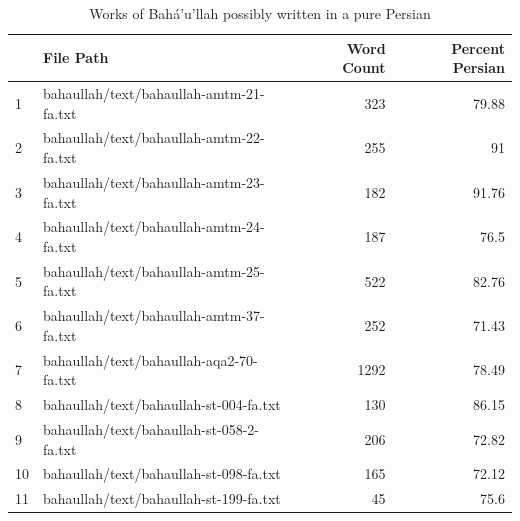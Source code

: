 \documentclass[12pt, oneside]{report}
\begin{document}
\begin{table}[]
	\centering
	\begin{tabular}{|l|l|r|r|}
		\hline
		\rowcolor[HTML]{EFEFEF} 
		\textbf{} & \textbf{File Path}                       & \textbf{Word Count}         & \textbf{Percent Persian}      \\ \hline
		1         & bahaullah/text/bahaullah-amtm-21-fa.txt  & \cellcolor[HTML]{FFFFFF}323 & \cellcolor[HTML]{FFFFFF}79.88 \\ \hline
		\rowcolor[HTML]{EFEFEF} 
		2         & bahaullah/text/bahaullah-amtm-22-fa.txt  & 255                         & 91                            \\ \hline
		\rowcolor[HTML]{FFFFFF} 
		3         & bahaullah/text/bahaullah-amtm-23-fa.txt  & 182                         & 91.76                         \\ \hline
		\rowcolor[HTML]{EFEFEF} 
		4         & bahaullah/text/bahaullah-amtm-24-fa.txt  & 187                         & 76.5                          \\ \hline
		\rowcolor[HTML]{FFFFFF} 
		5         & bahaullah/text/bahaullah-amtm-25-fa.txt  & 522                         & 82.76                         \\ \hline
		\rowcolor[HTML]{EFEFEF} 
		6         & bahaullah/text/bahaullah-amtm-37-fa.txt  & 252                         & 71.43                         \\ \hline
		\rowcolor[HTML]{FFFFFF} 
		7         & bahaullah/text/bahaullah-aqa2-70-fa.txt  & 1292                        & 78.49                         \\ \hline
		\rowcolor[HTML]{EFEFEF} 
		8         & bahaullah/text/bahaullah-st-004-fa.txt   & 130                         & 86.15                         \\ \hline
		\rowcolor[HTML]{FFFFFF} 
		9         & bahaullah/text/bahaullah-st-058-2-fa.txt & 206                         & 72.82                         \\ \hline
		\rowcolor[HTML]{EFEFEF} 
		10        & bahaullah/text/bahaullah-st-098-fa.txt   & 165                         & 72.12                         \\ \hline
		\rowcolor[HTML]{FFFFFF} 
		11        & bahaullah/text/bahaullah-st-199-fa.txt   & 45                          & 75.6                          \\ \hline
	\end{tabular}
	\caption{Works of Bah\'{a}'u'llah possibly written in a pure Persian }
	\label{tab:pure-persian}
\end{table}
\end{document}
